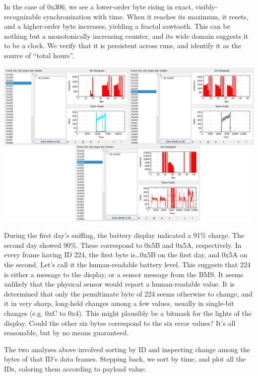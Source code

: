 \documentclass[letterpaper,10pt]{article}
\begin{document}
In the case of 0x306, we see a lower-order byte rising in exact, visibly-recognizable
synchronization with time. When it reaches its maximum, it resets, and a higher-order
byte increases, yielding a fractal sawtooth. This can be nothing but a monotonically
increasing counter, and its wide domain suggests it to be a clock. We verify that
it is persistent across runs, and identify it as the source of ``total hours''.

\begin{center}
\includegraphics[width=.9\linewidth]{savvycan-related.png}
\end{center}

During the first day's sniffing, the battery display indicated a 91\% charge.
The second day showed 90\%. These correspond to 0x5B and 0x5A, respectively.
In every frame having ID 224, the first byte is\ldots 0x5B on the first day,
and 0x5A on the second. Let's call it the human-readable battery level. This
suggests that 224 is either a message to the display, or a sensor message from
the BMS. It seems unlikely that the physical sensor would report a human-readable
value. It is determined that only the penultimate byte of 224 seems
otherwise to change, and it in very sharp, long-held changes among a few values,
usually in single-bit changes (e.g. 0xC to 0x4). This might plausibly be a
bitmask for the lights of the display. Could the other six bytes correspond to
the six error values? It's all reasonable, but by no means guaranteed.

The two analyses above involved sorting by ID and inspecting change among the
bytes of that ID's data frames. Stepping back, we sort by time, and plot all
the IDs, coloring them according to payload value:
\end{document}
